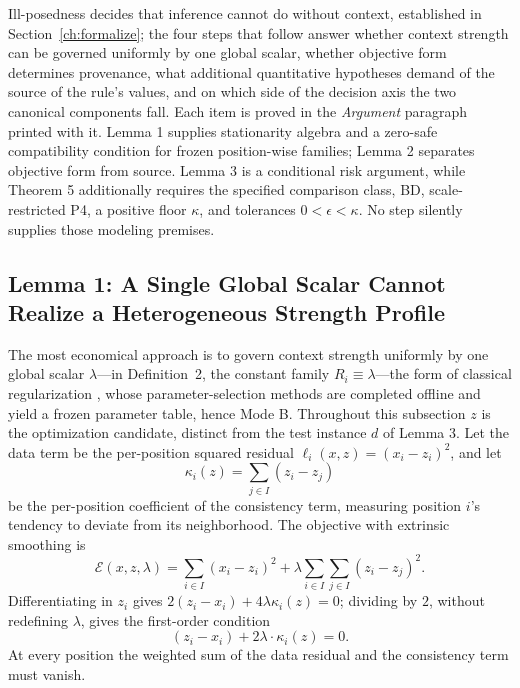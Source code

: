 \documentclass[twoside,11pt]{article}
\begin{document}
Ill-posedness decides that inference cannot do without context, established in Section~\ref{ch:formalize}; the four steps that follow answer whether context strength can be governed uniformly by one global scalar, whether objective form determines provenance, what additional quantitative hypotheses demand of the source of the rule's values, and on which side of the decision axis the two canonical components fall. Each item is proved in the \emph{Argument} paragraph printed with it. Lemma 1 supplies stationarity algebra and a zero-safe compatibility condition for frozen position-wise families; Lemma 2 separates objective form from source. Lemma 3 is a conditional risk argument, while Theorem 5 additionally requires the specified comparison class, BD, scale-restricted P4, a positive floor $\kappa$, and tolerances $0<\epsilon<\kappa$. No step silently supplies those modeling premises.

\subsection{Lemma 1: A Single Global Scalar Cannot Realize a Heterogeneous Strength Profile}

The most economical approach is to govern context strength uniformly by one global scalar $\lambda$---in Definition~2, the constant family $R_i \equiv \lambda$---the form of classical regularization \citep{poggio1985}, whose parameter-selection methods are completed offline and yield a frozen parameter table, hence Mode B. Throughout this subsection $z$ is the optimization candidate, distinct from the test instance $d$ of Lemma 3. Let the data term be the per-position squared residual $\ell_i(x,z) = (x_i - z_i)^2$, and let
\begin{equation}
\kappa_i (z) = \sum_{j \in I} (z_i - z_j)
\label{eq:kappa}
\end{equation}
be the per-position coefficient of the consistency term, measuring position $i$'s tendency to deviate from its neighborhood. The objective with extrinsic smoothing is
\begin{equation}
\mathcal{E}(x, z, \lambda) = \sum_{i \in I} (x_i - z_i)^2 + \lambda \sum_{i \in I} \sum_{j \in I} (z_i - z_j)^2 .
\label{eq:paradigmE}
\end{equation}
Differentiating in $z_i$ gives $2(z_i-x_i)+4\lambda\kappa_i(z)=0$; dividing by $2$, without redefining $\lambda$, gives the first-order condition
\begin{equation}
(z_i - x_i) + 2\lambda \cdot \kappa_i (z) = 0 .
\label{eq:foc}
\end{equation}
At every position the weighted sum of the data residual and the consistency term must vanish.
\end{document}
